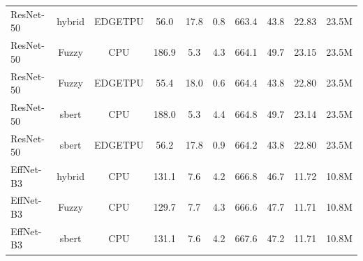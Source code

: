 \begin{table}[htbp]
\begin{tabular}{lccccccccc}
ResNet-50 & hybrid & EDGETPU & 56.0 & 17.8 & 0.8 & 663.4 & 43.8 & 22.83 & 23.5M \\
ResNet-50 & Fuzzy & CPU & 186.9 & 5.3 & 4.3 & 664.1 & 49.7 & 23.15 & 23.5M \\
ResNet-50 & Fuzzy & EDGETPU & 55.4 & 18.0 & 0.6 & 664.4 & 43.8 & 22.80 & 23.5M \\
ResNet-50 & sbert & CPU & 188.0 & 5.3 & 4.4 & 664.8 & 49.7 & 23.14 & 23.5M \\
ResNet-50 & sbert & EDGETPU & 56.2 & 17.8 & 0.9 & 664.2 & 43.8 & 22.80 & 23.5M \\
EffNet-B3 & hybrid & CPU & 131.1 & 7.6 & 4.2 & 666.8 & 46.7 & 11.72 & 10.8M \\
EffNet-B3 & Fuzzy & CPU & 129.7 & 7.7 & 4.3 & 666.6 & 47.7 & 11.71 & 10.8M \\
EffNet-B3 & sbert & CPU & 131.1 & 7.6 & 4.2 & 667.6 & 47.2 & 11.71 & 10.8M \\
\bottomrule
\end{tabular}
\end{table}

